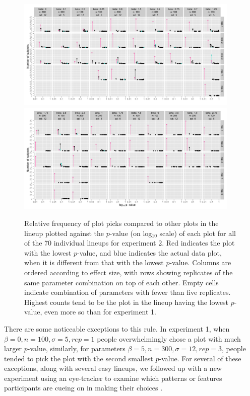 \documentclass[12pt]{article}
\begin{document}
\begin{figure}[hbtp]
   \centering
       \includegraphics[width=0.95\textwidth]{p_val_log_counts2-a.pdf}       
       \includegraphics[width=0.95\textwidth]{p_val_log_counts2-b.pdf}
       \caption{Relative frequency of plot picks compared to other plots in the lineup plotted against the $p$-value (on log$_{10}$ scale) of each plot for all of the 70 individual lineups for experiment 2. Red indicates the plot with the lowest $p$-value, and blue indicates the actual data plot, when it is different from that with the lowest $p$-value. 
Columns are ordered according to effect size, with rows showing replicates of the same parameter combination on top of each other.
       Empty cells indicate combination of parameters with fewer than five replicates. 
       Highest counts tend to be the plot in the lineup having the lowest $p$-value, even more so than for experiment 1.
       }
       \label{fig:P-val_log2}
\end{figure}


There are some noticeable exceptions to this rule. In experiment 1, when $\beta=0, n=100, \sigma=5, rep=1$ people overwhelmingly chose a plot with much larger $p$-value, similarly, for 
parameters $\beta=5, n=300, \sigma=12, rep=3$, people tended to pick the plot with the second smallest $p$-value. 
For several of these exceptions, along with several easy lineups, we followed up with a new experiment using an eye-tracker to examine which patterns or features participants are cueing on in making their choices \citep{zhao:2012:blinded}.
\end{document}

